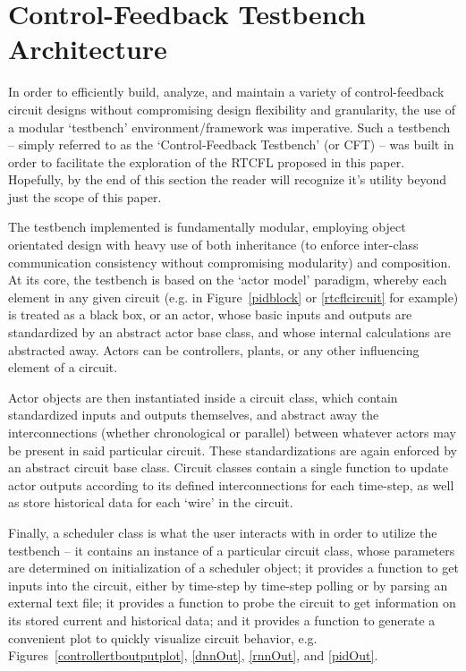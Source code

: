 \documentclass[10pt,twocolumn,letterpaper]{article}
\begin{document}
    \section{Control-Feedback Testbench Architecture} \label{tbarch}

        In order to efficiently build, analyze, and maintain a variety of control-feedback circuit designs without
        compromising design flexibility and granularity, the use of a modular `testbench' environment/framework was
        imperative. Such a testbench -- simply referred to as the `Control-Feedback Testbench' (or CFT) -- was built in
        order to facilitate the exploration of the RTCFL proposed in this paper. Hopefully, by the end of this section
        the reader will recognize it's utility beyond just the scope of this paper.

        The testbench implemented is fundamentally modular, employing object orientated design with heavy use of both
        inheritance (to enforce inter-class communication consistency without compromising modularity) and composition.
        At its core, the testbench is based on the `actor model' paradigm, whereby each element in any given circuit
        (e.g. in Figure~\ref{pidblock} or \ref{rtcflcircuit} for example) is treated as a black box, or an actor, whose
        basic inputs and outputs are standardized by an abstract actor base class, and whose internal calculations are
        abstracted away. Actors can be controllers, plants, or any other influencing element of a circuit. 
        
        Actor objects are then instantiated inside a circuit class, which contain standardized inputs and outputs
        themselves, and abstract away the interconnections (whether chronological or parallel) between whatever actors
        may be present in said particular circuit. These standardizations are again enforced by an abstract circuit base
        class. Circuit classes contain a single function to update actor outputs according to its defined
        interconnections for each time-step, as well as store historical data for each `wire' in the circuit.
        
        Finally, a scheduler class is what the user interacts with in order to utilize the testbench -- it contains an
        instance of a particular circuit class, whose parameters are determined on initialization of a scheduler object;
        it provides a function to get inputs into the circuit, either by time-step by time-step polling or by parsing an
        external text file; it provides a function to probe the circuit to get information on its stored current and
        historical data; and it provides a function to generate a convenient plot to quickly visualize circuit behavior,
        e.g. Figures~\ref{controllertboutputplot}, \ref{dnnOut}, \ref{rnnOut}, and \ref{pidOut}.
        
\end{document}
